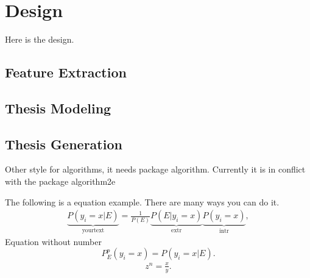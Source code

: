 \chapter{Design} \label{chapter:design}

Here is the design.

\section{Feature Extraction}

\section{Thesis Modeling}

\section{Thesis Generation}

Other style for algorithms, it needs package algorithm. Currently it is in conflict with the package algorithm2e
\begin{comment}

\begin{figure}[h!]
\begin{algorithm}[H]
\caption{Get Maximum of Two Numbers}
\begin{algorithmic}[1]
\Procedure{GetMaximum}{$a, b$}
\If{$a \geq b$}
  \State \textbf{return} $a$
\Else
  \State \textbf{return} $b$
\EndIf
\EndProcedure
\end{algorithmic}
\end{algorithm}
\caption{Pseudo Code of GetMaximum}
\label{figure:pseudo_code_of_get_maximum}
\end{figure}
	content...
\end{comment}

The following is a equation example. There are many ways you can do it.
\begin{equation}\label{eq1}          
\begin{aligned}                        
	\underbrace{P(y_i = x|E)}_\text{yourtext} = \frac{1}{P(E)} \underbrace{P(E|y_i = x)}_\text{extr}\underbrace{P(y_i = x)}_\text{intr},
\end{aligned}                          
\end{equation}
Equation without number
\begin{equation*}\label{eq1p}          
	P_E^{p}(y_i = x) = P(y_i = x|E).     
\end{equation*}
\begin{equation}\label{eq2}          
	\begin{aligned}                        
		z^{n} = \frac{x}{y}.     
	\end{aligned}                          
\end{equation}

